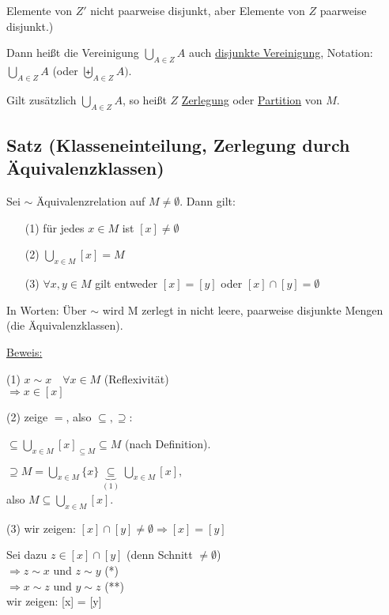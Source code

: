 \documentclass[a4paper, 12pt, twoside] {article}
\begin{document}
Elemente von $Z'$ nicht paarweise disjunkt, aber Elemente von $Z$ paarweise disjunkt.)

Dann heißt die Vereinigung $\displaystyle\bigcup_{A \in Z} A$ auch \underline{disjunkte Vereinigung},
Notation: $\displaystyle\bigcup_{A \in Z} A$ (oder $\displaystyle\biguplus_{A \in Z} A)$.

Gilt zusätzlich $\displaystyle\bigcup_{A \in Z} A$, so heißt $Z$ \underline{Zerlegung} oder \underline{Partition} von $M$.

\subsection{Satz (Klasseneinteilung, Zerlegung durch Äquivalenzklassen)}
Sei $\sim$ Äquivalenzrelation auf $M \neq \emptyset$. Dann gilt:

\begin{itemize}
\item [(1)] für jedes $x \in M$ ist $[x] \neq \emptyset$
\item [(2)] $\displaystyle\bigcup_{x \in M} [x] = M$
\item [(3)] $\forall x, y \in M$ gilt entweder $[x] = [y]$ oder $[x] \cap [y] = \emptyset$
\end{itemize}

In Worten: Über $\sim$ wird M zerlegt in nicht leere, paarweise disjunkte Mengen (die Äquivalenzklassen).

\underline{Beweis:}

(1) $x \sim x \quad \forall x \in M$ (Reflexivität) \\
$\Rightarrow x \in [x]$

(2) zeige $=$, also $\subseteq, \supseteq$:

$\subseteq \displaystyle\bigcup_{x \in M} [x]_{\subseteq M} \subseteq M$ (nach Definition).

$\supseteq M = \displaystyle\bigcup_{x \in M} \{x\} \underbrace{\subseteq}_{(1)} \displaystyle\bigcup_{x \in M} [x],$ \\
also $M \subseteq \displaystyle\bigcup_{x \in M} [x]$.

(3) wir zeigen: $[x] \cap [y] \neq \emptyset \Rightarrow [x] = [y]$

Sei dazu $z \in [x] \cap [y]$ (denn Schnitt $\neq \emptyset$) \\
$\Rightarrow z \sim x$ und $z \sim y$ (*) \\
$\Rightarrow x \sim z$ und $y \sim z$ (**) \\
wir zeigen: [x] = [y]
\end{document}
